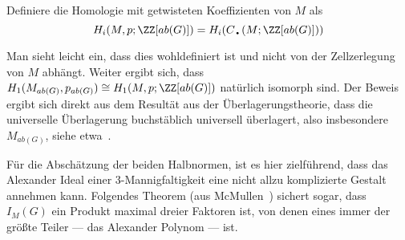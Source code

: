 	\begin{defn}
		Definiere die Homologie mit getwisteten Koeffizienten von $M$ als
		\[
		 H_i(M,p;\ZZ[ab(G)])=H_i(C_\text{\textbullet}(M;\ZZ[ab(G)])) 	
		 \] 
	\end{defn}

	Man sieht leicht ein, dass dies wohldefiniert ist und nicht von der Zellzerlegung von $M$ abhängt. Weiter ergibt sich, dass $H_1( M_{ab(G)} ,  p_{ab(G)}) \cong H_1(M,p;\ZZ[ab(G)])$ natürlich isomorph sind. Der Beweis ergibt sich direkt aus dem Resultät aus der Überlagerungstheorie, dass die universelle Überlagerung buchstäblich universell überlagert, also insbesondere $M_{ab(G)}$, siehe etwa~\cite[Kapitel~1.3]{Hatcher.2002}.
    
    Für die Abschätzung der beiden Halbnormen, ist es hier zielführend, dass das Alexander Ideal einer 3-Mannigfaltigkeit eine nicht allzu komplizierte Gestalt annehmen kann. Folgendes Theorem (aus McMullen~\cite{MCMULLEN.2002}) sichert sogar, dass $I_M(G)$ ein Produkt maximal dreier Faktoren ist, von denen eines immer der größte Teiler --- das Alexander Polynom --- ist. 

